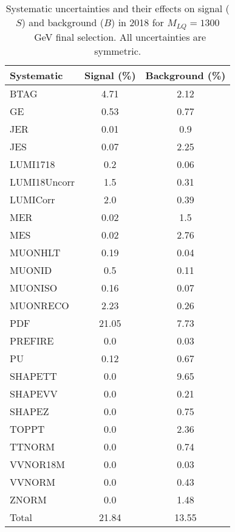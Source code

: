 \begin{table}[htbp]
\begin{center}
\caption{Systematic uncertainties and their effects on signal ($S$) and background ($B$) in 2018 for $M_{LQ}=1300$~GeV final selection. All uncertainties are symmetric.}
\begin{tabular}{lcc}
\hline\hline
Systematic & Signal (\%) & Background (\%) \\ \hline 
BTAG & 4.71 & 2.12\\ 
GE & 0.53 & 0.77\\ 
JER & 0.01 & 0.9\\ 
JES & 0.07 & 2.25\\ 
LUMI1718 & 0.2 & 0.06\\ 
LUMI18Uncorr & 1.5 & 0.31\\ 
LUMICorr & 2.0 & 0.39\\ 
MER & 0.02 & 1.5\\ 
MES & 0.02 & 2.76\\ 
MUONHLT & 0.19 & 0.04\\ 
MUONID & 0.5 & 0.11\\ 
MUONISO & 0.16 & 0.07\\ 
MUONRECO & 2.23 & 0.26\\ 
PDF & 21.05 & 7.73\\ 
PREFIRE & 0.0 & 0.03\\ 
PU & 0.12 & 0.67\\ 
SHAPETT & 0.0 & 9.65\\ 
SHAPEVV & 0.0 & 0.21\\ 
SHAPEZ & 0.0 & 0.75\\ 
TOPPT & 0.0 & 2.36\\ 
TTNORM & 0.0 & 0.74\\ 
VVNOR18M & 0.0 & 0.03\\ 
VVNORM & 0.0 & 0.43\\ 
ZNORM & 0.0 & 1.48\\ 
Total & 21.84 & 13.55\\ \hline \hline
\end{tabular}
\label{tab:SysUncertainties_uujj_1300}
\end{center}
\end{table}


